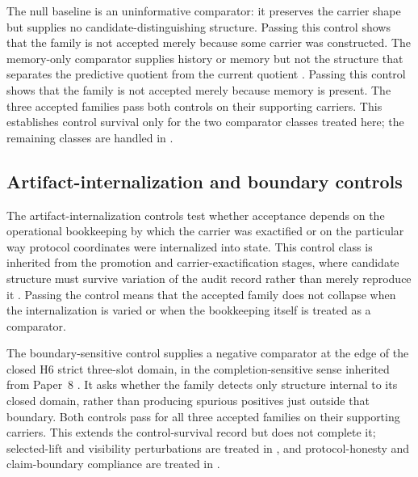 \documentclass[11pt]{article}
\newcommand{\NewLayer}{H6}
\newcommand{\PaperEight}{Paper~8}
\theoremstyle{definition}
\begin{document}
The null baseline is an uninformative comparator: it preserves the carrier
shape but supplies no candidate-distinguishing structure.  Passing this control
shows that the family is not accepted merely because some carrier was
constructed.  The memory-only comparator supplies history or memory but not the
structure that separates the predictive quotient from the current quotient
\cite{Tsiokos2026HolonomyMemory}.  Passing this control shows that the family
is not accepted merely because memory is present.  The three accepted families
pass both controls on their supporting carriers.  This establishes control
survival only for the two comparator classes treated here; the remaining
classes are handled in
.

\subsection{Artifact-internalization and boundary controls}\label{subsec:control-panel-artifact-boundary}

The artifact-internalization controls test whether acceptance depends on the
operational bookkeeping by which the carrier was exactified or on the particular
way protocol coordinates were internalized into state.  This control class is
inherited from the promotion and carrier-exactification stages, where candidate
structure must survive variation of the audit record rather than merely
reproduce it \cite{Tsiokos2026PromotionCriteria,Tsiokos2026CarrierExactification}.
Passing the control means that the accepted family does not collapse when the
internalization is varied or when the bookkeeping itself is treated as a
comparator.

The boundary-sensitive control supplies a negative comparator at the edge of
the closed \NewLayer{} strict three-slot domain, in the completion-sensitive
sense inherited from \PaperEight{} \cite{Tsiokos2026CarrierToEvent}.  It asks
whether the family detects only structure internal to its closed domain, rather
than producing spurious positives just outside that boundary.  Both controls
pass for all three accepted families on their supporting carriers.  This
extends the control-survival record but does not complete it; selected-lift and
visibility perturbations are treated in
, and protocol-honesty and
claim-boundary compliance are treated in
.
\end{document}
